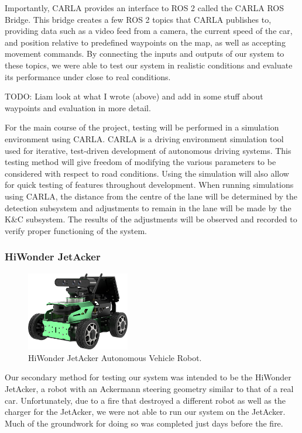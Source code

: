 \documentclass[titlepage,draft]{article}
\begin{document}
{Importantly, CARLA provides an interface to ROS 2 called the CARLA ROS Bridge. This bridge creates a few ROS 2 topics that CARLA publishes to, providing data such as a video feed from a camera, the current speed of the car, and position relative to predefined waypoints on the map, as well as accepting movement commands. By connecting the inputs and outputs of our system to these topics, we were able to test our system in realistic conditions and evaluate its performance under close to real conditions.

TODO: Liam look at what I wrote (above) and add in some stuff about waypoints and evaluation in more detail.

For the main course of the project, testing will be performed in a simulation environment using CARLA. CARLA is a driving environment simulation tool used for iterative, test-driven development of autonomous driving systems.\cite{dosovitskiy2017carla} This testing method will give freedom of modifying the various parameters to be considered with respect to road conditions. Using the simulation will also allow for quick testing of features throughout development. When running simulations using CARLA, the distance from the centre of the lane will be determined by the detection subsystem and adjustments to remain in the lane will be made by the K\&C subsystem. The results of the adjustments will be observed and recorded to verify proper functioning of the system.

\subsubsection{HiWonder JetAcker}

\begin{figure}
	\centering
	\includegraphics*[width=0.4\textwidth]{JetAcker1}
	\caption{HiWonder JetAcker Autonomous Vehicle Robot.}
	\label{fig:JetAcker}
\end{figure}

Our secondary method for testing our system was intended to be the HiWonder JetAcker, a robot with an Ackermann steering geometry similar to that of a real car. Unfortunately, due to a fire that destroyed a different robot as well as the charger for the JetAcker, we were not able to run our system on the JetAcker. Much of the groundwork for doing so was completed just days before the fire.

}
\end{document}
